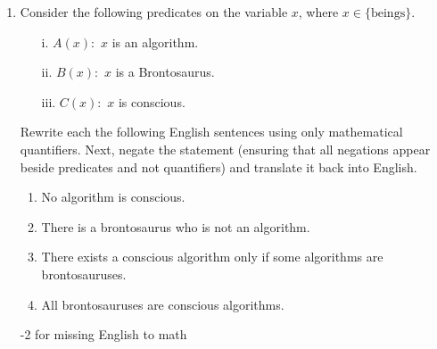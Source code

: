 \begin{enumerate}

















    
    \item Consider the following predicates on the variable $x$, where $x \in \{\text{beings}\}.$
    \begin{enumerate}
        \item[i.] $A(x):$ $x$ is an algorithm.
        \item[ii.] $B(x):$ $x$ is a Brontosaurus.
        \item[iii.] $C(x):$ $x$ is conscious.
    \end{enumerate}
    Rewrite each the following English sentences using only mathematical quantifiers. Next, negate the statement (ensuring that all negations appear beside predicates and not quantifiers) and translate it back into English. 
    
    \begin{enumerate}
        \item No algorithm is conscious.
        
        \item There is a brontosaurus who is not an algorithm.
        
        \item There exists a conscious algorithm only if some algorithms are brontosauruses.
        
        \item All brontosauruses are conscious algorithms.
    \end{enumerate}
    
    \begin{rubric}
    -2 for missing English to math
    

\end{rubric}
\end{enumerate}
